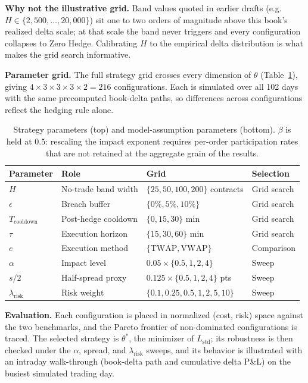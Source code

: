 \documentclass{article}
\begin{document}
\begin{whybox}
\textbf{Why not the illustrative grid.} Band values quoted in earlier drafts (e.g.\
$H \in \{2{,}500,\dots,20{,}000\}$) sit one to two orders of magnitude above this book's
realized delta scale; at that scale the band never triggers and every configuration
collapses to Zero Hedge. Calibrating $H$ to the empirical delta distribution is what
makes the grid search informative.
\end{whybox}

\textbf{Parameter grid.} The full strategy grid crosses every dimension of $\theta$
(Table~\ref{tab:grid}), giving $4 \times 3 \times 3 \times 3 \times 2 = 216$
configurations. Each is simulated over all 102 days with the same precomputed book-delta
paths, so differences across configurations reflect the hedging rule alone.

\begin{table}[htbp]
\centering
\small
\setlength{\tabcolsep}{5pt}
\begin{tabular}{llll}
\toprule
\textbf{Parameter} & \textbf{Role} & \textbf{Grid} & \textbf{Selection} \\
\midrule
$H$ & No-trade band width & $\{25, 50, 100, 200\}$ contracts & Grid search \\
$\epsilon$ & Breach buffer & $\{0\%, 5\%, 10\%\}$ & Grid search \\
$T_{\text{cooldown}}$ & Post-hedge cooldown & $\{0, 15, 30\}$ min & Grid search \\
$\tau$ & Execution horizon & $\{15, 30, 60\}$ min & Grid search \\
$e$ & Execution method & $\{\text{TWAP}, \text{VWAP}\}$ & Comparison \\
\midrule
$\alpha$ & Impact level & $0.05 \times \{0.5, 1, 2, 4\}$ & Sweep \\
$s/2$ & Half-spread proxy & $0.125 \times \{0.5, 1, 2, 4\}$ pts & Sweep \\
$\lambda_{\text{risk}}$ & Risk weight & $\{0.1, 0.25, 0.5, 1, 2, 5, 10\}$ & Sweep \\
\bottomrule
\end{tabular}
\caption{Strategy parameters (top) and model-assumption parameters (bottom). $\beta$ is
held at $0.5$: rescaling the impact exponent requires per-order participation rates that
are not retained at the aggregate grain of the results.}
\label{tab:grid}
\end{table}

\textbf{Evaluation.} Each configuration is placed in normalized (cost, risk) space
against the two benchmarks, and the Pareto frontier of non-dominated configurations is
traced. The selected strategy is $\theta^{*}$, the minimizer of
$L_{\text{std}}$; its robustness is then checked under the $\alpha$, spread, and
$\lambda_{\text{risk}}$ sweeps, and its behavior is illustrated with an intraday
walk-through (book-delta path and cumulative delta P\&L) on the busiest simulated
trading day.
\end{document}
